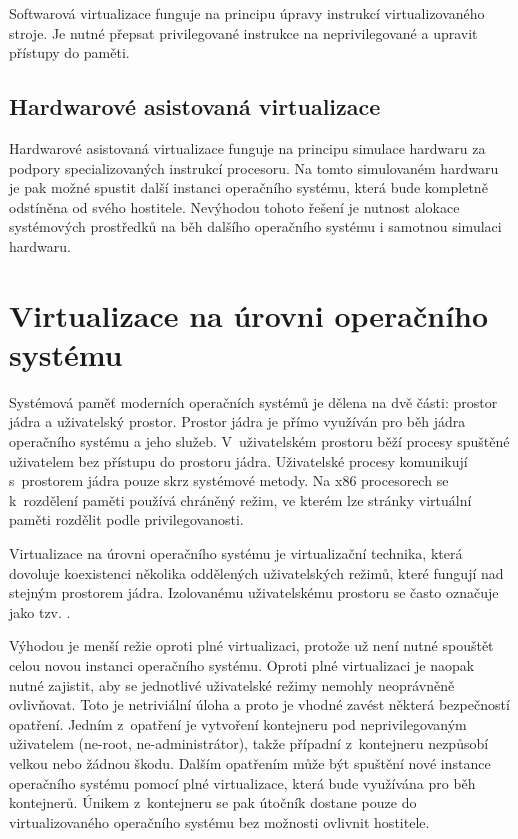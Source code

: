 Softwarová virtualizace funguje na principu úpravy instrukcí virtualizovaného stroje.
Je nutné přepsat privilegované instrukce na neprivilegované a upravit přístupy do paměti.


\subsection{Hardwarové asistovaná virtualizace}

Hardwarové asistovaná virtualizace funguje na principu simulace hardwaru za podpory specializovaných instrukcí procesoru.
Na tomto simulovaném hardwaru je pak možné spustit další instanci operačního systému, která bude kompletně odstíněna od svého hostitele.
Nevýhodou tohoto řešení je nutnost alokace systémových prostředků na běh dalšího operačního systému i samotnou simulaci hardwaru.

\section{Virtualizace na úrovni operačního systému}

Systémová paměť moderních operačních systémů je dělena na dvě části: prostor jádra a uživatelský prostor.
Prostor jádra je přímo využíván pro běh jádra operačního systému a jeho služeb.
V~uživatelském prostoru běží procesy spuštěné uživatelem bez přístupu do prostoru jádra.
Uživatelské procesy komunikují s~prostorem jádra pouze skrz systémové metody.
Na x86 procesorech se k~rozdělení paměti používá chráněný režim, ve kterém lze stránky virtuální paměti rozdělit podle privilegovanosti.

Virtualizace na úrovni operačního systému je virtualizační technika, která dovoluje koexistenci několika oddělených uživatelských režimů, které fungují nad stejným prostorem jádra.
Izolovanému uživatelskému prostoru se často označuje jako tzv. .

Výhodou je menší režie oproti plné virtualizaci, protože už není nutné spouštět celou novou instanci operačního systému.
Oproti plné virtualizaci je naopak nutné zajistit, aby se jednotlivé uživatelské režimy nemohly neoprávněně ovlivňovat.
Toto je netriviální úloha a proto je vhodné zavést některá bezpečností opatření.
Jedním z~opatření je vytvoření kontejneru pod neprivilegovaným uživatelem (ne-root, ne-administrátor), takže případní  z~kontejneru nezpůsobí velkou nebo žádnou škodu.
Dalším opatřením může být spuštění nové instance operačního systému pomocí plné virtualizace, která bude využívána pro běh kontejnerů.
Únikem z~kontejneru se pak útočník dostane pouze do virtualizovaného operačního systému bez možnosti ovlivnit hostitele.


